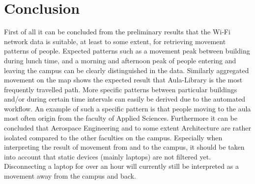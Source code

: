 \chapter{Conclusion}
First of all it can be concluded from the preliminary results that the Wi-Fi network data is suitable, at least to some extent, for retrieving movement patterns of people. Expected patterns such as a movement peak between building during lunch time, and a morning and afternoon peak of people entering and leaving the campus can be clearly distinguished in the data. Similarly aggregated movement on the map shows the expected result that Aula-Library is the most frequently travelled path. More specific patterns between particular buildings and/or during certain time intervals can easily be derived due to the automated workflow. An example of such a specific pattern is that people moving to the aula most often origin from the faculty of Applied Sciences. Furthermore it can be concluded that Aerospace Engineering and to some extent Architecture are rather isolated compared to the other faculties on the campus. Especially when interpreting the result of movement from and to the campus, it should be taken into account that static devices (mainly laptops) are not filtered yet. Disconnecting a laptop for over an hour will currently still be interpreted as a movement away from the campus and back.

